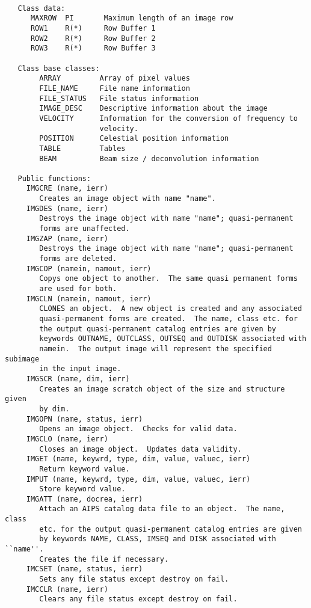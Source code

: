 {\small\begin{verbatim}

   Class data:
      MAXROW  PI       Maximum length of an image row
      ROW1    R(*)     Row Buffer 1
      ROW2    R(*)     Row Buffer 2
      ROW3    R(*)     Row Buffer 3

   Class base classes:
        ARRAY         Array of pixel values
        FILE_NAME     File name information
        FILE_STATUS   File status information
        IMAGE_DESC    Descriptive information about the image
        VELOCITY      Information for the conversion of frequency to
                      velocity.
        POSITION      Celestial position information
        TABLE         Tables
        BEAM          Beam size / deconvolution information

   Public functions:
     IMGCRE (name, ierr)
        Creates an image object with name "name".
     IMGDES (name, ierr)
        Destroys the image object with name "name"; quasi-permanent
        forms are unaffected.
     IMGZAP (name, ierr)
        Destroys the image object with name "name"; quasi-permanent
        forms are deleted.
     IMGCOP (namein, namout, ierr)
        Copys one object to another.  The same quasi permanent forms
        are used for both.
     IMGCLN (namein, namout, ierr)
        CLONES an object.  A new object is created and any associated
        quasi-permanent forms are created.  The name, class etc. for
        the output quasi-permanent catalog entries are given by
        keywords OUTNAME, OUTCLASS, OUTSEQ and OUTDISK associated with
        namein.  The output image will represent the specified subimage
        in the input image.
     IMGSCR (name, dim, ierr)
        Creates an image scratch object of the size and structure given
        by dim.
     IMGOPN (name, status, ierr)
        Opens an image object.  Checks for valid data.
     IMGCLO (name, ierr)
        Closes an image object.  Updates data validity.
     IMGET (name, keywrd, type, dim, value, valuec, ierr)
        Return keyword value.
     IMPUT (name, keywrd, type, dim, value, valuec, ierr)
        Store keyword value.
     IMGATT (name, docrea, ierr)
        Attach an AIPS catalog data file to an object.  The name, class
        etc. for the output quasi-permanent catalog entries are given
        by keywords NAME, CLASS, IMSEQ and DISK associated with ``name''.
        Creates the file if necessary.
     IMCSET (name, status, ierr)
        Sets any file status except destroy on fail.
     IMCCLR (name, ierr)
        Clears any file status except destroy on fail.

\end{verbatim}}
